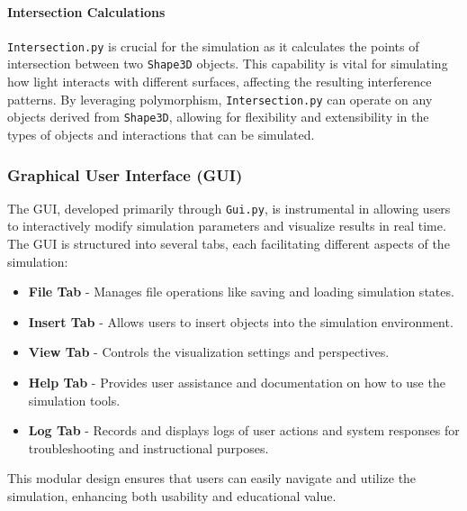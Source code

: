 \documentclass[../main.tex]{subfiles}
\begin{document}
\paragraph{Intersection Calculations}
\texttt{Intersection.py} is crucial for the simulation as it calculates the points of intersection between two \texttt{Shape3D} objects. This capability is vital for simulating how light interacts with different surfaces, affecting the resulting interference patterns. By leveraging polymorphism, \texttt{Intersection.py} can operate on any objects derived from \texttt{Shape3D}, allowing for flexibility and extensibility in the types of objects and interactions that can be simulated.

\subsubsection{Graphical User Interface (GUI)}
The GUI, developed primarily through \texttt{Gui.py}, is instrumental in allowing users to interactively modify simulation parameters and visualize results in real time. The GUI is structured into several tabs, each facilitating different aspects of the simulation:
\begin{itemize}
    \item \textbf{File Tab} - Manages file operations like saving and loading simulation states.
    \item \textbf{Insert Tab} - Allows users to insert objects into the simulation environment.
    \item \textbf{View Tab} - Controls the visualization settings and perspectives.
    \item \textbf{Help Tab} - Provides user assistance and documentation on how to use the simulation tools.
    \item \textbf{Log Tab} - Records and displays logs of user actions and system responses for troubleshooting and instructional purposes.
\end{itemize}
This modular design ensures that users can easily navigate and utilize the simulation, enhancing both usability and educational value.
\end{document}
